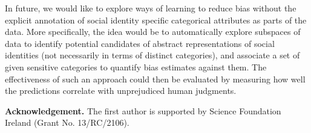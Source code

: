 \documentclass[letterpaper]{article}
\begin{document}
In future, we would like to explore ways of learning to reduce bias without the explicit annotation of social identity specific categorical attributes as parts of the data. More specifically, the idea would be to automatically explore subspaces of data to identify potential candidates of abstract representations of social identities (not necessarily in terms of distinct categories), and associate a set of given sensitive categories to quantify bias estimates against them. The effectiveness of such an approach could then be evaluated by measuring how well the predictions correlate with unprejudiced human judgments.

\textbf{Acknowledgement.}
The first author is supported by Science Foundation Ireland (Grant No. 13/RC/2106).



\end{document}
